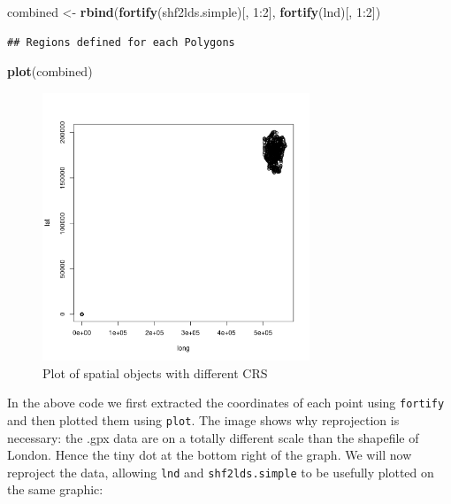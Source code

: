\documentclass[]{article}
\newenvironment{Shaded}{}{}
\newcommand{\KeywordTok}[1]{\textcolor[rgb]{0.00,0.44,0.13}{\textbf{{#1}}}}
\newcommand{\DecValTok}[1]{\textcolor[rgb]{0.25,0.63,0.44}{{#1}}}
\newcommand{\NormalTok}[1]{{#1}}
\let\Oldincludegraphics\includegraphics
\renewcommand{\includegraphics}[1]{\Oldincludegraphics[width=8cm]{#1}}
\begin{document}
\begin{Shaded}
\begin{Highlighting}[]
\NormalTok{combined <- }\KeywordTok{rbind}\NormalTok{(}\KeywordTok{fortify}\NormalTok{(shf2lds.simple)[, }\DecValTok{1}\NormalTok{:}\DecValTok{2}\NormalTok{], }\KeywordTok{fortify}\NormalTok{(lnd)[, }\DecValTok{1}\NormalTok{:}\DecValTok{2}\NormalTok{])}
\end{Highlighting}
\end{Shaded}
\begin{verbatim}
## Regions defined for each Polygons
\end{verbatim}
\begin{Shaded}
\begin{Highlighting}[]
\KeywordTok{plot}\NormalTok{(combined)}
\end{Highlighting}
\end{Shaded}
\begin{figure}[htbp]
\centering
\includegraphics{figure/Plot_of_spatial_objects_with_different_CRS.png}
\caption{Plot of spatial objects with different CRS}
\end{figure}

In the above code we first extracted the coordinates of each point using
\texttt{fortify} and then plotted them using \texttt{plot}. The image
shows why reprojection is necessary: the .gpx data are on a totally
different scale than the shapefile of London. Hence the tiny dot at the
bottom right of the graph. We will now reproject the data, allowing
\texttt{lnd} and \texttt{shf2lds.simple} to be usefully plotted on the
same graphic:
\end{document}
